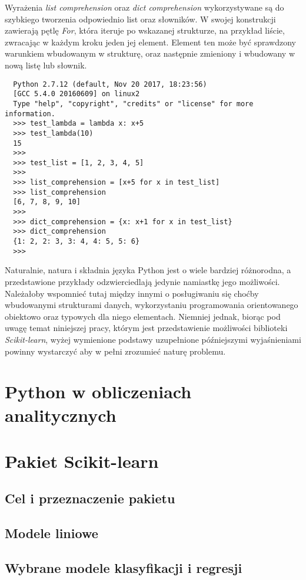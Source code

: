 Wyrażenia \textit{list comprehension} oraz \textit{dict comprehension} wykorzystywane są do szybkiego tworzenia odpowiednio list oraz słowników.
W swojej konstrukcji zawierają pętlę \textit{For}, która iteruje po wskazanej strukturze, na przykład liście, zwracając w każdym kroku jeden jej element.
Element ten może być sprawdzony warunkiem wbudowanym w strukturę, oraz następnie zmieniony i wbudowany w nową listę lub słownik.

\begin{lstlisting}
  Python 2.7.12 (default, Nov 20 2017, 18:23:56) 
  [GCC 5.4.0 20160609] on linux2
  Type "help", "copyright", "credits" or "license" for more information. 
  >>> test_lambda = lambda x: x+5
  >>> test_lambda(10)
  15
  >>> 
  >>> test_list = [1, 2, 3, 4, 5]
  >>> 
  >>> list_comprehension = [x+5 for x in test_list]
  >>> list_comprehension
  [6, 7, 8, 9, 10]
  >>> 
  >>> dict_comprehension = {x: x+1 for x in test_list}
  >>> dict_comprehension
  {1: 2, 2: 3, 3: 4, 4: 5, 5: 6}
  >>> 
\end{lstlisting}

Naturalnie, natura i składnia języka Python jest o wiele bardziej różnorodna, a przedstawione przykłady odzwierciedlają jedynie namiastkę jego możliwości.
Należałoby wspomnieć tutaj między innymi o posługiwaniu się choćby wbudowanymi strukturami danych, wykorzystaniu programowania orientowanego obiektowo oraz typowych dla niego elementach.
Niemniej jednak, biorąc pod uwagę temat niniejszej pracy, którym jest przedstawienie możliwości biblioteki \textit{Scikit-learn}, wyżej wymienione podstawy uzupełnione późniejszymi wyjaśnieniami powinny wystarczyć aby w pełni zrozumieć naturę problemu.




\section{Python w obliczeniach analitycznych}
\section{Pakiet Scikit-learn}
\subsection{Cel i przeznaczenie pakietu}
\subsection{Modele liniowe}
\subsection{Wybrane modele klasyfikacji i regresji}

